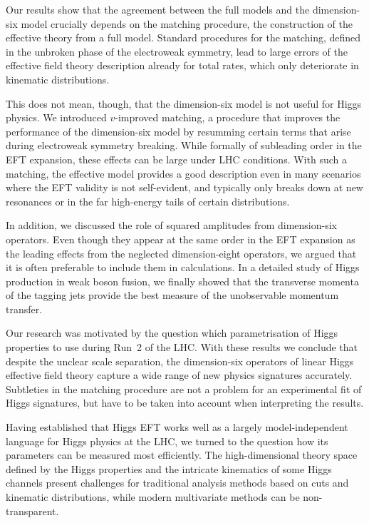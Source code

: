Our results show that the agreement between the full models and the
dimension-six model crucially depends on the matching procedure, \ie
the construction of the effective theory from a full model. Standard
procedures for the matching, defined in the unbroken phase of the
electroweak symmetry, lead to large errors of the effective field
theory description already for total rates, which only deteriorate
in kinematic distributions.

This does not mean, though, that the dimension-six model is not useful
for Higgs physics. We introduced $v$-improved matching, a procedure
that improves the performance of the dimension-six model by resumming
certain terms that arise during electroweak symmetry breaking. While
formally of subleading order in the EFT expansion, these effects can
be large under LHC conditions. With such a matching, the effective
model provides a good description even in many scenarios where the EFT
validity is not self-evident, and typically only breaks down at new
resonances or in the far high-energy tails of certain distributions.

In addition, we discussed the role of squared amplitudes from
dimension-six operators. Even though they appear at the same order in
the EFT expansion as the leading effects from the neglected
dimension-eight operators, we argued that it is often preferable to
include them in calculations. In a detailed study of Higgs production
in weak boson fusion, we finally showed that the transverse momenta of
the tagging jets provide the best measure of the unobservable momentum
transfer.

Our research was motivated by the question which parametrisation of
Higgs properties to use during Run~2 of the LHC. With these results we
conclude that despite the unclear scale separation, the dimension-six
operators of linear Higgs effective field theory capture a wide range
of new physics signatures accurately. Subtleties in the matching
procedure are not a problem for an experimental fit of Higgs
signatures, but have to be taken into account when interpreting the
results.

\newparagraph
%
Having established that Higgs EFT works well as a largely
model-independent language for Higgs physics at the LHC, we turned to
the question how its parameters can be measured most efficiently. The
high-dimensional theory space defined by the Higgs properties and the
intricate kinematics of some Higgs channels present challenges for
traditional analysis methods based on cuts and kinematic
distributions, while modern multivariate methods can be non-transparent.

